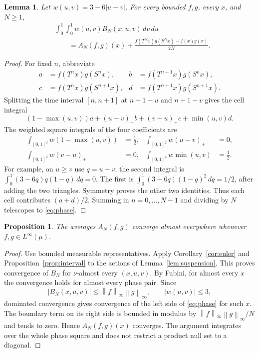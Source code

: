 \documentclass[11pt,a4paper]{article}
\newtheorem{lemma}[theorem]{Lemma}
\newtheorem{proposition}[theorem]{Proposition}
\theoremstyle{definition}
\newenvironment{statementframe}
  {\par\addvspace{4pt}\noindent
   \setlength{\fboxsep}{6pt}\setlength{\fboxrule}{0.45pt}%
   \begin{lrbox}{\statementbox}%
   \begin{minipage}{\dimexpr\linewidth-2\fboxsep-2\fboxrule\relax}}
  {\end{minipage}\end{lrbox}%
   \fbox{\usebox{\statementbox}}\par\addvspace{4pt}}
\newcommand{\1}{\mathbf1}
\newcommand{\norm}[1]{\left\lVert #1\right\rVert}
\begin{document}
\begin{statementframe}
\begin{lemma}\label{lem:phase}
Let $w(u,v)=3-6|u-v|$. For every bounded $f,g$, every $x$, and $N\ge1$,
\begin{equation}\label{eq:phase}
\begin{split}
 &\int_0^1\!\int_0^1 w(u,v)B_N(x,u,v)\,dv\,du\\
 &\qquad=A_N(f,g)(x)+\frac{f(T^Nx)g(S^Nx)-f(x)g(x)}{2N}.
\end{split}
\end{equation}
\end{lemma}
\end{statementframe}
\begin{proof}
For fixed $n$, abbreviate
\begin{align*}
 a&=f(T^nx)g(S^nx),& b&=f(T^{n+1}x)g(S^nx),\\
 c&=f(T^nx)g(S^{n+1}x),& d&=f(T^{n+1}x)g(S^{n+1}x).
\end{align*}
Splitting the time interval $[n,n+1]$ at $n+1-u$ and $n+1-v$ gives
the cell integral
\[
 (1-\max(u,v))a+(u-v)_+b+(v-u)_+c+\min(u,v)d.
\]
The weighted square integrals of the four coefficients are
\begin{align*}
 \int_{[0,1]^2}w(1-\max(u,v))&=\tfrac12,&
 \int_{[0,1]^2}w(u-v)_+&=0,\\
 \int_{[0,1]^2}w(v-u)_+&=0,&
 \int_{[0,1]^2}w\min(u,v)&=\tfrac12.
\end{align*}
For example, on $u\ge v$ use $q=u-v$; the second integral is
$\int_0^1(3-6q)q(1-q)\,dq=0$. The first is
$\int_0^1(3-6q)(1-q)^2\,dq=1/2$, after adding the two triangles.
Symmetry proves the other two identities. Thus each cell contributes
$(a+d)/2$. Summing in $n=0,\ldots,N-1$ and dividing by $N$ telescopes
to \eqref{eq:phase}.
\end{proof}

\begin{statementframe}
\begin{proposition}\label{prop:bounded}
The averages $A_N(f,g)$ converge almost everywhere whenever
$f,g\in L^\infty(\mu)$.
\end{proposition}
\end{statementframe}
\begin{proof}
Use bounded measurable representatives. Apply
Corollary~\ref{cor:euler} and Proposition~\ref{prop:interval} to the
actions of Lemma~\ref{lem:suspension}. This proves convergence of
$B_N$ for $\nu$-almost every $(x,u,v)$. By Fubini, for almost every
$x$ the convergence holds for almost every phase pair. Since
\[
 |B_N(x,u,v)|\le\norm f_\infty\norm g_\infty,
 \qquad |w(u,v)|\le3,
\]
dominated convergence gives convergence of the left side of
\eqref{eq:phase} for such $x$. The boundary term on its right side is
bounded in modulus by $\norm f_\infty\norm g_\infty/N$ and tends to
zero. Hence $A_N(f,g)(x)$ converges. The argument integrates over the
whole phase square and does not restrict a product null set to a
diagonal.
\end{proof}
\end{document}
